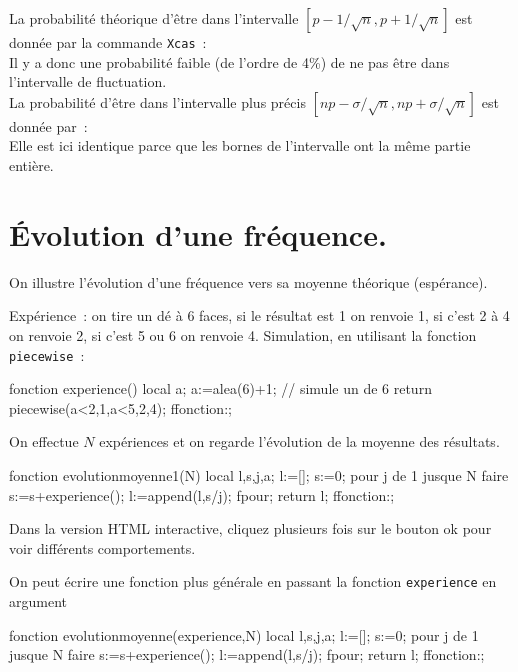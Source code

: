 \documentclass[12pt,a4paper]{book}
\begin{document}
\begin{giacjshere}
La probabilit\'e th\'eorique d'\^etre dans l'intervalle 
$[p-1/\sqrt{n},p+1/\sqrt{n}]$ est donn\'ee par la commande
{\tt Xcas}~:\\
Il y a donc une probabilit\'e faible (de l'ordre de 4\%) 
de ne pas \^etre dans l'intervalle de fluctuation.\\
La probabilit\'e d'\^etre dans l'intervalle plus pr\'ecis
$[np-\sigma/\sqrt{n},np+\sigma/\sqrt{n}]$ est donn\'ee par~:\\
Elle est ici identique parce que les bornes de l'intervalle ont la m\^eme 
partie enti\`ere.

\section{\'Evolution d'une fr\'equence.}
On illustre l'\'evolution d'une fr\'equence vers sa moyenne th\'eorique
(esp\'erance).

Exp\'erience~: on tire un d\'e \`a 6 faces, si le r\'esultat est 1 on
renvoie 1, si c'est 2 \`a 4 on renvoie 2, si c'est 5 ou 6 on renvoie 4.
Simulation, en utilisant la fonction \verb|piecewise|~: 
\begin{giaconload}
fonction experience()
  local a;
  a:=alea(6)+1; // simule un de 6
  return piecewise(a<2,1,a<5,2,4);
ffonction:;
\end{giaconload}

On effectue $N$ exp\'eriences et on regarde l'\'evolution de la moyenne
des r\'esultats.
\begin{giaconload}
fonction evolutionmoyenne1(N)
  local l,s,j,a;
  l:=[];
  s:=0;
  pour j de 1 jusque N faire
    s:=s+experience();
    l:=append(l,s/j);
  fpour;
  return l;
ffonction:;
\end{giaconload}
Dans la version HTML interactive, 
cliquez plusieurs fois sur le bouton ok pour voir diff\'erents 
comportements.

On peut \'ecrire une fonction plus g\'en\'erale en passant 
la fonction \verb|experience| en argument
\begin{giaconload}
fonction evolutionmoyenne(experience,N)
  local l,s,j,a;
  l:=[];
  s:=0;
  pour j de 1 jusque N faire
    s:=s+experience();
    l:=append(l,s/j);
  fpour;
  return l;
ffonction:;
\end{giaconload}


\end{giacjshere}
\end{document}
